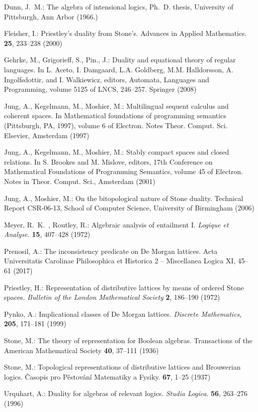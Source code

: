 \documentclass{amsart}
\theoremstyle{plain}
\theoremstyle{definition}
\begin{document}
\begin{thebibliography}{}
 Dunn, J.~M.: The algebra of intensional logics, Ph.~D. thesis, University of Pittsburgh,
Ann Arbor (1966.)

 Fleisher, I.: Priestley’s duality from Stone’s. Advances in Applied Mathematics. \textbf{25}, 233–238 (2000)

 Gehrke, M., Grigorieff, S., Pin., J.: Duality and equational theory of regular languages. In L. Aceto, I. Damgaard, L.A. Goldberg, M.M. Halldorsson, A. Ingolfsdottir, and I. Walkiewicz, editors, Automata,
Languages and Programming, volume 5125 of LNCS, 246--257. Springer (2008)

 Jung, A., Kegelmann, M., Moshier, M.: Multilingual sequent calculus and coherent spaces. In
Mathematical foundations of programming semantics (Pittsburgh, PA, 1997), volume 6 of Electron.
Notes Theor. Comput. Sci. Elsevier, Amsterdam (1997) 


 Jung, A., Kegelmann, M., Moshier, M.: Stably compact spaces and closed relations. In S. Brookes
and M. Mislove, editors, 17th Conference on Mathematical Foundations of Programming Semantics,
volume 45 of Electron. Notes in Theor. Comput. Sci., Amsterdam (2001)

 Jung, A., Moshier, M.: On the bitopological nature of Stone duality. Technical Report CSR-06-13, School of Computer Science, University of Birmingham (2006)

 Meyer, R.~K.~, Routley, R.: Algebraic analysis of entailment I. \emph{Logique
et Analyse.} \textbf{15}, 407--428 (1972) 

 Prenosil, A.: The inconsistency predicate on De Morgan lattices. Acta Universitatis Carolinae Philosophica et Historica 2 – Miscellanea Logica XI, 45--61 (2017) 

Priestley, H.: Representation of distributive lattices by means of ordered Stone spaces. \emph{Bulletin of the London Mathematical Society} \textbf{2}, 186--190 (1972) 

 Pynko, A.: Implicational classes of De Morgan lattices. \emph{Discrete Mathematics}, \textbf{205}, 171--181 (1999)



Stone, M.: The theory of representation for Boolean algebras. Transactions of the American Mathematical Society \textbf{40}, 37--111 (1936) 


Stone, M.: Topological representations of distributive lattices and Brouwerian logics. \v{C}asopis pro P\v{e}stov\'an\'i Matematiky a Fysiky. \textbf{67}, 1--25 (1937) 

 Urquhart, A.: Duality for algebras of relevant logics. \emph{Studia Logica}. \textbf{56}, 263--276 (1996) 



\end{thebibliography}
\end{document}
